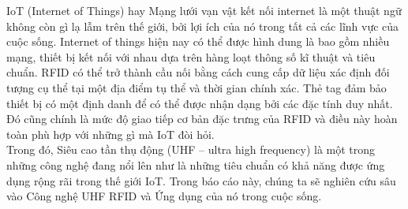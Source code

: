 \cleardoublepage
{}

\begin{abstracts}
IoT (Internet of Things) hay Mạng lưới vạn vật kết nối internet là một thuật ngữ không còn gì lạ lẫm trên thế giới, bởi lợi ích của nó trong tất cả các lĩnh vực của cuộc sống. Internet of things hiện nay có thể được hình dung là bao gồm nhiều mạng, thiết bị kết nối với nhau dựa trên hàng loạt thông số kĩ thuật và tiêu chuẩn. RFID có thể trở thành cầu nối bằng cách cung cấp dữ liệu xác định đối tượng cụ thể tại một địa điểm tụ thể và thời gian chính xác. Thẻ tag đảm bảo thiết bị có một định danh để có thể được nhận dạng bởi các đặc tính duy nhất. Đó cũng chính là mức độ giao tiếp cơ bản đặc trưng của RFID và điều này hoàn toàn phù hợp với những gì mà IoT đòi hỏi.\\
Trong đó, Siêu cao tần thụ động (UHF – ultra high frequency) là một trong những công nghệ đang nổi lên như là những tiêu chuẩn có khả năng được ứng dụng rộng rãi trong thế giới IoT. Trong báo cáo này, chúng ta sẽ nghiên cứu sâu vào Công nghệ UHF RFID và Ứng dụng của nó trong cuộc sống.
\end{abstracts}

